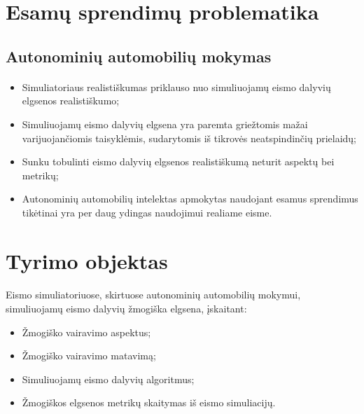 \documentclass{beamer}
\begin{document}
\section{Esamų sprendimų problematika}

\subsection{Autonominių automobilių mokymas}
\begin{frame}{\insertsection}
\framesubtitle{\insertsubsection}
\begin{itemize}
	\item Simuliatoriaus realistiškumas priklauso nuo simuliuojamų eismo dalyvių elgsenos realistiškumo;
	\item Simuliuojamų eismo dalyvių elgsena yra paremta griežtomis mažai varijuojančiomis taisyklėmis, sudarytomis iš tikrovės neatspindinčių prielaidų;
	\item Sunku tobulinti eismo dalyvių elgsenos realistiškumą neturit aspektų bei metrikų;
	\item Autonominių automobilių intelektas apmokytas naudojant esamus sprendimus tikėtinai yra per daug ydingas naudojimui realiame eisme.
\end{itemize}
\end{frame}



\section{Tyrimo objektas}


\begin{frame}{\insertsection}
\framesubtitle{\insertsubsection}
Eismo simuliatoriuose, skirtuose autonominių automobilių mokymui, simuliuojamų eismo dalyvių žmogiška elgsena, įskaitant:
\begin{itemize}
	\item Žmogiško vairavimo aspektus;
	\item Žmogiško vairavimo matavimą;
	\item Simuliuojamų eismo dalyvių algoritmus;
	\item Žmogiškos elgsenos metrikų skaitymas iš eismo simuliacijų.
\end{itemize}
\end{frame}
\end{document}
